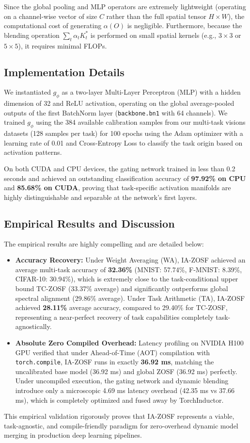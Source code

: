 \documentclass{article}
\theoremstyle{plain}
\theoremstyle{definition}
\theoremstyle{remark}
\begin{document}
Since the global pooling and MLP operators are extremely lightweight (operating on a channel-wise vector of size $C$ rather than the full spatial tensor $H \times W$), the computational cost of generating $\alpha(O)$ is negligible. Furthermore, because the blending operation $\sum_t \alpha_t K^*_t$ is performed on small spatial kernels (e.g., $3 \times 3$ or $5 \times 5$), it requires minimal FLOPs.

\subsection{Implementation Details}
We instantiated $g_\phi$ as a two-layer Multi-Layer Perceptron (MLP) with a hidden dimension of 32 and ReLU activation, operating on the global average-pooled outputs of the first BatchNorm layer (\texttt{backbone.bn1} with 64 channels). We trained $g_\phi$ using the 384 available calibration samples from our multi-task visions datasets (128 samples per task) for 100 epochs using the Adam optimizer with a learning rate of 0.01 and Cross-Entropy Loss to classify the task origin based on activation patterns.

On both CUDA and CPU devices, the gating network trained in less than 0.2 seconds and achieved an outstanding classification accuracy of \textbf{97.92\% on CPU} and \textbf{85.68\% on CUDA}, proving that task-specific activation manifolds are highly distinguishable and separable at the network's first layers.

\subsection{Empirical Results and Discussion}
The empirical results are highly compelling and are detailed below:
\begin{itemize}
    \item \textbf{Accuracy Recovery:} Under Weight Averaging (WA), IA-ZOSF achieved an average multi-task accuracy of \textbf{32.36\%} (MNIST: 57.74\%, F-MNIST: 8.39\%, CIFAR-10: 30.94\%), which is extremely close to the task-conditional upper bound TC-ZOSF (33.37\% average) and significantly outperforms global spectral alignment (29.86\% average). Under Task Arithmetic (TA), IA-ZOSF achieved \textbf{28.11\%} average accuracy, compared to 29.40\% for TC-ZOSF, representing a near-perfect recovery of task capabilities completely task-agnostically.
    \item \textbf{Absolute Zero Compiled Overhead:} Latency profiling on NVIDIA H100 GPU verified that under Ahead-of-Time (AOT) compilation with \texttt{torch.compile}, IA-ZOSF runs in exactly \textbf{36.92 ms}, matching the uncalibrated base model (36.92 ms) and global ZOSF (36.92 ms) perfectly. Under uncompiled execution, the gating network and dynamic blending introduce only a microscopic 4.69 ms latency overhead (42.35 ms vs 37.66 ms), which is completely optimized and fused away by TorchInductor.
\end{itemize}
This empirical validation rigorously proves that IA-ZOSF represents a viable, task-agnostic, and compile-friendly paradigm for zero-overhead dynamic model merging in production deep learning pipelines.
\end{document}
